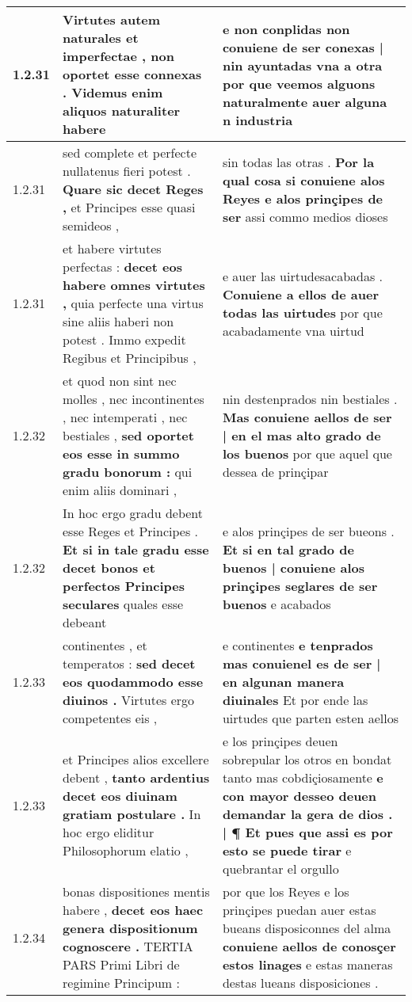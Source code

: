\begin{tabular}{|p{1cm}|p{6.5cm}|p{6.5cm}|}
1.2.31 & Virtutes autem naturales et imperfectae , \textbf{ non oportet esse connexas . } Videmus enim aliquos naturaliter habere & e non conplidas \textbf{ non conuiene de ser conexas | nin ayuntadas vna a otra } por que veemos alguons naturalmente auer alguna n industria \\\hline
1.2.31 & sed complete et perfecte nullatenus fieri potest . \textbf{ Quare sic decet Reges , } et Principes esse quasi semideos , & sin todas las otras . \textbf{ Por la qual cosa si conuiene alos Reyes e alos prinçipes de ser } assi commo medios dioses \\\hline
1.2.31 & et habere virtutes perfectas : \textbf{ decet eos habere omnes virtutes , } quia perfecte una virtus sine aliis haberi non potest . Immo expedit Regibus et Principibus , & e auer las uirtudesacabadas . \textbf{ Conuiene a ellos de auer todas las uirtudes } por que acabadamente vna uirtud \\\hline
1.2.32 & et quod non sint nec molles , nec incontinentes , nec intemperati , nec bestiales , \textbf{ sed oportet eos esse in summo gradu bonorum : } qui enim aliis dominari , & nin destenprados nin bestiales . \textbf{ Mas conuiene aellos de ser | en el mas alto grado de los buenos } por que aquel que dessea de prinçipar \\\hline
1.2.32 & In hoc ergo gradu debent esse Reges et Principes . \textbf{ Et si in tale gradu esse decet bonos et perfectos Principes seculares } quales esse debeant & e alos prinçipes de ser bueons . \textbf{ Et si en tal grado de buenos | conuiene alos prinçipes seglares de ser buenos } e acabados \\\hline
1.2.33 & continentes , et temperatos : \textbf{ sed decet eos quodammodo esse diuinos . } Virtutes ergo competentes eis , & e continentes \textbf{ e tenprados mas conuienel es de ser | en algunan manera diuinales } Et por ende las uirtudes que parten esten aellos \\\hline
1.2.33 & et Principes alios excellere debent , \textbf{ tanto ardentius decet eos diuinam gratiam postulare . } In hoc ergo eliditur Philosophorum elatio , & e los prinçipes deuen sobrepular los otros en bondat tanto mas cobdiçiosamente \textbf{ e con mayor desseo deuen demandar la gera de dios . | ¶ Et pues que assi es por esto se puede tirar } e quebrantar el orgullo \\\hline
1.2.34 & bonas dispositiones mentis habere , \textbf{ decet eos haec genera dispositionum cognoscere . } TERTIA PARS Primi Libri de regimine Principum : & por que los Reyes e los prinçipes puedan auer estas bueans disposiconnes del alma \textbf{ conuiene aellos de conosçer estos linages } e estas maneras destas lueans disposiciones . \\\hline

\end{tabular}
